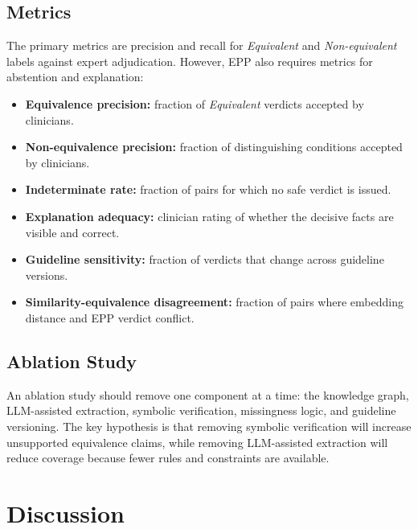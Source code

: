 \documentclass[english,5p,twocolumn,preprint]{elsarticle}
\begin{document}
\subsection{Metrics}
The primary metrics are precision and recall for \emph{Equivalent} and \emph{Non-equivalent} labels against expert adjudication. However, EPP also requires metrics for abstention and explanation:
\begin{itemize}[leftmargin=*]
    \item \textbf{Equivalence precision:} fraction of \emph{Equivalent} verdicts accepted by clinicians.
    \item \textbf{Non-equivalence precision:} fraction of distinguishing conditions accepted by clinicians.
    \item \textbf{Indeterminate rate:} fraction of pairs for which no safe verdict is issued.
    \item \textbf{Explanation adequacy:} clinician rating of whether the decisive facts are visible and correct.
    \item \textbf{Guideline sensitivity:} fraction of verdicts that change across guideline versions.
    \item \textbf{Similarity-equivalence disagreement:} fraction of pairs where embedding distance and EPP verdict conflict.
\end{itemize}

\subsection{Ablation Study}
An ablation study should remove one component at a time: the knowledge graph, LLM-assisted extraction, symbolic verification, missingness logic, and guideline versioning. The key hypothesis is that removing symbolic verification will increase unsupported equivalence claims, while removing LLM-assisted extraction will reduce coverage because fewer rules and constraints are available.

\section{Discussion}
\end{document}

